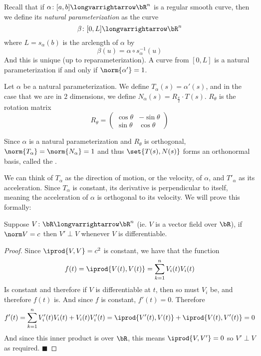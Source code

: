\documentclass[10pt]{article}
\def\pmat#1{\begin{pmatrix} #1 \end{pmatrix}}
\def\pmat#1{\begin{pmatrix}#1\end{pmatrix}}
\let\longto=\longvarrightarrow
\def\qed{%
    \ifmmode%
        \eqno\blacksquare%
    \else%
        \hskip1cm\allowbreak\hbox{}\nobreak\hfill$\blacksquare$%
    \fi%
}
\begin{document}


\bigskip

Recall that if $\alpha\colon[a,b]\longto\bR^n$ is a regular smooth curve, then we define its \emph{natural parameterization} as the curve
\[ \beta\colon[0,L]\longto\bR^n \]
where $L=s_\alpha(b)$ is the arclength of $\alpha$ by
\[ \beta(u) = \alpha\circ s_\alpha^{-1}(u) \]
And this is unique (up to reparameterization).
A curve from $[0,L]$ is a natural parameterization if and only if $\norm{\alpha'}=1$.

\begin{defn*}

    Let $\alpha$ be a natural parameterization.
    We define $T_\alpha(s)=\alpha'(s)$, and in the case that we are in $2$ dimensions, we define $N_\alpha(s)=R_{\frac\pi2}\cdot T(s)$.
    $R_\theta$ is the rotation matrix
    \[ R_\theta = \pmat{\cos\theta & -\sin\theta \\ \sin\theta & \cos\theta} \]

    Since $\alpha$ is a natural parameterization and $R_\theta$ is orthogonal, $\norm{T_\alpha}=\norm{N_\alpha}=1$ and thus $\set{T(s),N(s)}$ forms an orthonormal basis, called the
    .

\end{defn*}

We can think of $T_\alpha$ as the direction of motion, or the velocity, of $\alpha$, and $T'_\alpha$ as its acceleration.
Since $T_\alpha$ is constant, its derivative is perpendicular to itself, meaning the acceleration of $\alpha$ is orthogonal to its velocity.
We will prove this formally:

\begin{prop*}

    Suppose $V\colon\bR\longto\bR^n$ (ie. $V$ is a vector field over $\bR$), if $\norm V=c$ then $V'\perp V$ whenever $V$ is differentiable.

\end{prop*}

\begin{proof}

    Since $\iprod{V,V}=c^2$ is constant, we have that the function
    \[ f(t) = \iprod{V(t),V(t)} = \sum_{k=1}^n V_i(t)V_i(t) \]
    Is constant and therefore if $V$ is differentiable at $t$, then so must $V_i$ be, and therefore $f(t)$ is.
    And since $f$ is constant, $f'(t)=0$.
    Therefore
    \[ f'(t) = \sum_{k=1}^n V_i'(t)V_i(t) + V_i(t)V_i'(t) = \iprod{V'(t),V(t)} + \iprod{V(t),V'(t)} = 0 \]
    And since this inner product is over $\bR$, this means $\iprod{V,V'}=0$ so $V'\perp V$ as required.
    \qed

\end{proof}
\end{document}
